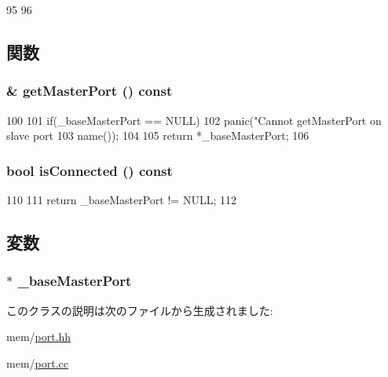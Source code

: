 \begin{DoxyCode}
95 {
96 }
\end{DoxyCode}


\subsection{関数}
\hypertarget{classBaseSlavePort_a0ac9bcda7a99ed66768dfe5c4a8b7e5f}{
\subsubsection[{getMasterPort}]{ \& getMasterPort () const}}
\label{classBaseSlavePort_a0ac9bcda7a99ed66768dfe5c4a8b7e5f}



\begin{DoxyCode}
100 {
101     if(_baseMasterPort == NULL)
102         panic("Cannot getMasterPort on slave port %
103               name());
104 
105     return *_baseMasterPort;
106 }
\end{DoxyCode}
\hypertarget{classBaseSlavePort_a180fa55a4bf36580963bed9e3e09c227}{
\subsubsection[{isConnected}]{\setlength{\rightskip}{0pt plus 5cm}bool isConnected () const}}
\label{classBaseSlavePort_a180fa55a4bf36580963bed9e3e09c227}



\begin{DoxyCode}
110 {
111     return _baseMasterPort != NULL;
112 }
\end{DoxyCode}


\subsection{変数}
\hypertarget{classBaseSlavePort_ad5f452d3408bb62d2df1e46d11070b9a}{
\subsubsection[{\_\-baseMasterPort}]{$\ast$ {\bf \_\-baseMasterPort}}}
\label{classBaseSlavePort_ad5f452d3408bb62d2df1e46d11070b9a}


このクラスの説明は次のファイルから生成されました:\begin{DoxyCompactItemize}
\item 
mem/\hyperlink{port_8hh}{port.hh}\item 
mem/\hyperlink{port_8cc}{port.cc}\end{DoxyCompactItemize}
